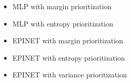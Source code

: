 \documentclass[preview]{standalone}
\begin{document}
\begin{center}
\begin{itemize}
            \item MLP with margin prioritization
            \item MLP with entropy prioritization
            \item EPINET with margin prioritization
            \item EPINET with entropy prioritization
            \item EPINET with variance prioritization
            \end{itemize}
\end{center}
\end{document}

